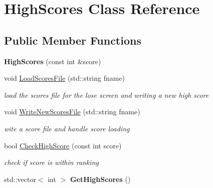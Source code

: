 \hypertarget{classHighScores}{}\section{High\+Scores Class Reference}
\label{classHighScores}
\subsection*{Public Member Functions}
\begin{DoxyCompactItemize}
\item 
{\bfseries High\+Scores} (const int \&score)\hypertarget{classHighScores_a97fe6bd2c756e0d859edfabd599fa2f9}{}\label{classHighScores_a97fe6bd2c756e0d859edfabd599fa2f9}

\item 
void \hyperlink{classHighScores_a6f2b987d1e22912ed1e86b054f7ecec3}{Load\+Scores\+File} (std\+::string fname)\hypertarget{classHighScores_a6f2b987d1e22912ed1e86b054f7ecec3}{}\label{classHighScores_a6f2b987d1e22912ed1e86b054f7ecec3}

\begin{DoxyCompactList}\small\item\em load the scores file for the lose screen and writing a new high score \end{DoxyCompactList}\item 
void \hyperlink{classHighScores_a99cf76b0593da5f8ddd7936708b096d3}{Write\+New\+Scores\+File} (std\+::string fname)\hypertarget{classHighScores_a99cf76b0593da5f8ddd7936708b096d3}{}\label{classHighScores_a99cf76b0593da5f8ddd7936708b096d3}

\begin{DoxyCompactList}\small\item\em wite a score file and handle score loading \end{DoxyCompactList}\item 
bool \hyperlink{classHighScores_a66f36eed176fcb4ed2c458fafa02456c}{Check\+High\+Score} (const int score)\hypertarget{classHighScores_a66f36eed176fcb4ed2c458fafa02456c}{}\label{classHighScores_a66f36eed176fcb4ed2c458fafa02456c}

\begin{DoxyCompactList}\small\item\em check if score is within ranking \end{DoxyCompactList}\item 
std\+::vector$<$ int $>$ {\bfseries Get\+High\+Scores} ()\hypertarget{classHighScores_a68288e51074ec22ee8ea314ff7017cce}{}\label{classHighScores_a68288e51074ec22ee8ea314ff7017cce}


\end{DoxyCompactItemize}

